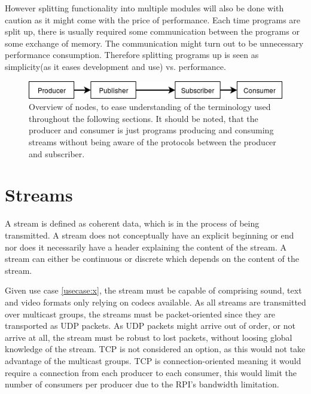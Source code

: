 However splitting functionality into multiple modules will also be done with caution as it might come with the price of performance. Each time programs are split up, there is usually required some communication between the programs or some exchange of memory. The communication might turn out to be unnecessary performance consumption. Therefore splitting programs up is seen as simplicity(as it eases development and use) vs. performance.



\begin{figure}[h!]
	\includegraphics[width=1\textwidth]{figures/analysis-terminilogy-overview.png}
	\caption{Overview of nodes, to ease understanding of the terminology used throughout the following sections. It should be noted, that the producer and consumer is just programs producing and consuming streams without being aware of the protocols between the producer and subscriber.}
\end{figure}

\section{Streams}
A stream is defined as coherent data, which is in the process of being transmitted. A stream does not conceptually have an explicit beginning or end nor does it necessarily have a header explaining the content of the stream. A stream can either be continuous or discrete which depends on the content of the stream. 


Given use case \ref{usecase:x}, the stream must be capable of comprising sound, text and video formats only relying on codecs available. As all streams are transmitted over multicast groups, the streams must be packet-oriented since they are transported as UDP packets.
As UDP packets might arrive out of order, or not arrive at all, the stream must be robust to lost packets, without loosing global knowledge of the stream.
TCP is not considered an option, as this would not take advantage of the multicast groups. TCP is connection-oriented meaning it would require a connection from each producer to each consumer, this would limit the number of consumers per producer due to the RPI's bandwidth limitation.

